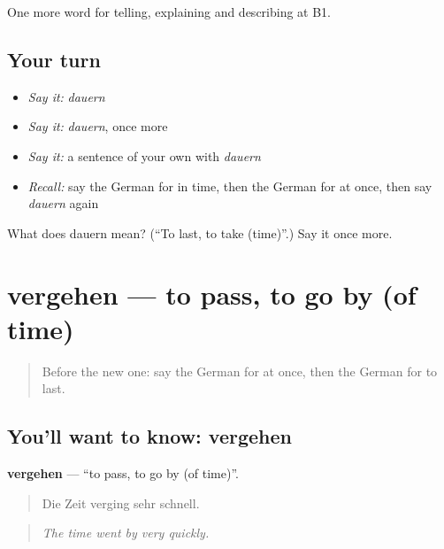\begin{grammarlens}[title={What you've built}]
One more word for telling, explaining and describing at B1.
\end{grammarlens}

\subsection*{Your turn}
\begin{itemize}
\raggedright
  \item \emph{Say it:} \emph{dauern}
  \item \emph{Say it:} \emph{dauern}, once more
  \item \emph{Say it:} a sentence of your own with \emph{dauern}
  \item \emph{Recall:} say the German for in time, then the German for at once, then say \emph{dauern} again
\end{itemize}

\begin{tcolorbox}[breakable,colback=teal!4,colframe=teal!35!black,title={Before you move on}]
What does dauern mean? (\textquotedblleft{}To last, to take (time)\textquotedblright{}.) Say it once more.
\end{tcolorbox}
\section[vergehen]{vergehen — to pass, to go by (of time)}

\label{lesson:GE-C267-vergehen}



\begin{quote}
Before the new one: say the German for at once, then the German for to last.
\end{quote}

\subsection*{You'll want to know: vergehen}
\textbf{vergehen} — \textquotedblleft{}to pass, to go by (of time)\textquotedblright{}.

\begin{quote}
Die Zeit verging sehr schnell.
\end{quote}

\begin{quote}
\emph{The time went by very quickly.}
\end{quote}

